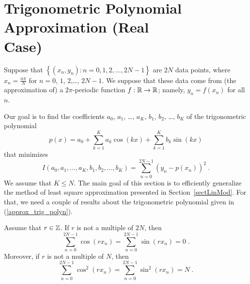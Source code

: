 \section[Trigonometric Polynomial Approximation (Real Case)]{Trigonometric Polynomial Approximation (Real\\ Case)}

Suppose that
$\displaystyle \left\{ (x_n,y_n) : n=0,1,2,\ldots, 2N-1\right\}$ are $2N$
data points, where
$\displaystyle x_n = \frac{n \pi}{N}$ for $n=0$, $1$, $2$,\ldots, $2N-1$.
We suppose that these data come from (the approximation of) a
$2\pi$-periodic function $f:\mathbb{R}\rightarrow \mathbb{R}$; namely, $y_n = f(x_n)$
for all $n$.

Our goal is to find the coefficients $a_0$, $a_1$, \ldots, $a_K$, $b_1$,
$b_2$, \ldots, $b_K$ of the trigonometric polynomial
\begin{equation} \label{approx_trig_polyn}
p(x) = a_0 + \sum_{k=1}^{K} a_k \cos(k x) + \sum_{k=1}^{K} b_k \sin(k x)
\end{equation}
that minimizes
\[
I(a_0,a_1,\ldots,a_K,b_1,b_2,\ldots,b_K) =
\sum_{n=0}^{2N-1} \left( y_n - p(x_n) \right)^2 \ .
\]
We assume that $K\leq N$.  The main goal of this section is to
efficiently generalize the method of least square approximation
presented in Section~\ref{sectLinMod}.  For that, we need a couple of
results about the trigonometric polynomial given in
(\ref{approx_trig_polyn}).

\begin{lemma}
Assume that $r \in \mathbb{Z}$.  If $r$ is not a multiple of $2N$, then
\begin{equation} \label{approx_trig_equ1}
\sum_{n=0}^{2N-1} \cos(r x_n) = \sum_{n=0}^{2N-1} \sin(r x_n) = 0 \; .
\end{equation}
Moreover, if $r$ is not a multiple of $N$, then
\begin{equation}  \label{approx_trig_equ2}
\sum_{n=0}^{2N-1} \cos^2(r x_n) = \sum_{n=0}^{2N-1} \sin^2(r x_n) = N \; .
\end{equation}
\label{approx_trig_realSP}
\end{lemma}

